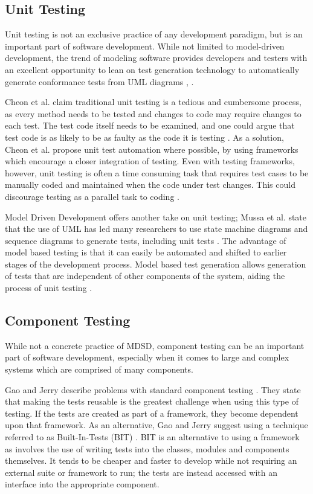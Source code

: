 \documentclass[fina_report_innit.tex]{subfiles}
\begin{document}
\subsection{Unit Testing}
Unit testing is not an exclusive practice of any development paradigm, but is an important part of software development. While not limited to model-driven development, the trend of modeling software provides developers and testers with an excellent opportunity to lean on test generation technology to automatically generate conformance tests from UML diagrams \cite{mussa2009survey}, \cite{hartmann2004uml}.  

Cheon et al. claim traditional unit testing is a tedious and cumbersome process, as every method needs to be tested and changes to code may require changes to each test. The test code itself needs to be examined, and one could argue that test code is as likely to be as faulty as the code it is testing \cite{cheon2002simple}. As a solution, Cheon et al. propose unit test automation where possible, by using frameworks which encourage a closer integration of testing. Even with testing frameworks, however, unit testing is often a time consuming task that requires test cases to be manually coded and maintained when the code under test changes. This could discourage testing as a parallel task to coding \cite{cheon2002simple}. 

Model Driven Development offers another take on unit testing; Mussa et al. state that the use of UML has led many researchers to use state machine diagrams and sequence diagrams to generate tests, including unit tests \cite{mussa2009survey}. The advantage of model based testing is that it can easily be automated and shifted to earlier stages of the development process. Model based test generation allows generation of tests that are independent of other components of the system, aiding the process of unit testing \cite{javed2007automated}.

\subsection{Component Testing}
While not a concrete practice of MDSD, component testing can be an important part of software development, especially when it comes to large and complex systems which are comprised of many components.

Gao and Jerry describe problems with standard component testing \cite{gao2000component}. They state that making the tests reusable is the greatest challenge when using this type of testing. If the tests are created as part of a framework, they become dependent upon that framework. As an alternative, Gao and Jerry suggest using a technique referred to as Built-In-Tests (BIT) \cite{gao2000component}. BIT is an alternative to using a framework as involves the use of writing tests into the classes, modules and components themselves. It tends to be cheaper and faster to develop while not requiring an external suite or framework to run; the tests are instead accessed with an interface into the appropriate component.
\end{document}
